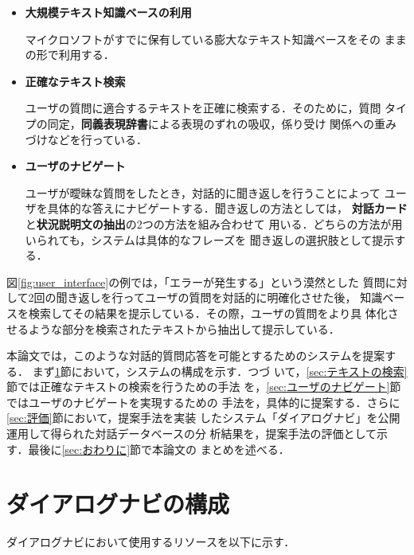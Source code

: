\begin{itemize}
 \item {\bf 大規模テキスト知識ベースの利用}

       マイクロソフトがすでに保有している膨大なテキスト知識ベースをその
       ままの形で利用する．

 \item {\bf 正確なテキスト検索}

       ユーザの質問に適合するテキストを正確に検索する．そのために，質問
       タイプの同定，{\bf 同義表現辞書}による表現のずれの吸収，係り受け
       関係への重みづけなどを行っている．

 \item {\bf ユーザのナビゲート}
       
       ユーザが曖昧な質問をしたとき，対話的に聞き返しを行うことによって
       ユーザを具体的な答えにナビゲートする．聞き返しの方法としては，
       {\bf 対話カード}と{\bf 状況説明文の抽出}の2つの方法を組み合わせて
       用いる．どちらの方法が用いられても，システムは具体的なフレーズを
       聞き返しの選択肢として提示する．

\end{itemize}

\vspace*{5mm}

図\ref{fig:user_interface}の例では，「エラーが発生する」という漠然とした
質問に対して2回の聞き返しを行ってユーザの質問を対話的に明確化させた後，
知識ベースを検索してその結果を提示している．その際，ユーザの質問をより具
体化させるような部分を検索されたテキストから抽出して提示している．

本論文では，このような対話的質問応答を可能とするためのシステムを提案する．
まず\ref{sec:ダイアログナビの構成}節において，システムの構成を示す．つづ
いて，\ref{sec:テキストの検索}節では正確なテキストの検索を行うための手法
を，\ref{sec:ユーザのナビゲート}節ではユーザのナビゲートを実現するための
手法を，具体的に提案する．さらに\ref{sec:評価}節において，提案手法を実装
したシステム「ダイアログナビ」を公開運用して得られた対話データベースの分
析結果を，提案手法の評価として示す．最後に\ref{sec:おわりに}節で本論文の
まとめを述べる．

\newpage
\section{ダイアログナビの構成} \label{sec:ダイアログナビの構成}


ダイアログナビにおいて使用するリソースを以下に示す．

